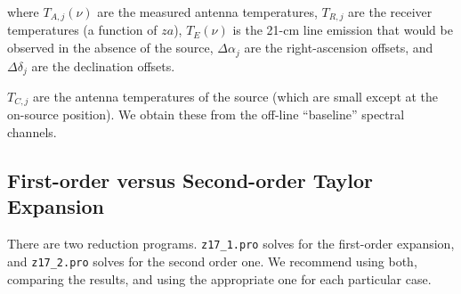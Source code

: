 \documentclass[12pt,preprint]{aastex}
\begin{document}
\noindent where $T_{A,j}(\nu)$ are the measured antenna temperatures,
$T_{R,j}$ are the receiver temperatures (a function of $za$),
$T_{E}(\nu)$ is the 21-cm line emission that would be observed in the
absence of the source,  $\Delta \alpha_j$ are
the right-ascension offsets, and $\Delta \delta_j$ are
the declination offsets. 

$T_{C,j}$ are the antenna temperatures of the source
(which are small except at the on-source position). We obtain these from
the off-line ``baseline'' spectral channels.

\subsection{First-order versus Second-order Taylor Expansion \label{versus}} 

There are two reduction programs. {\tt z17\_1.pro} solves for the
first-order expansion, and {\tt z17\_2.pro} solves for the second order
one. We recommend using both, comparing the results, and using the
appropriate one for each particular case. 
\end{document}
